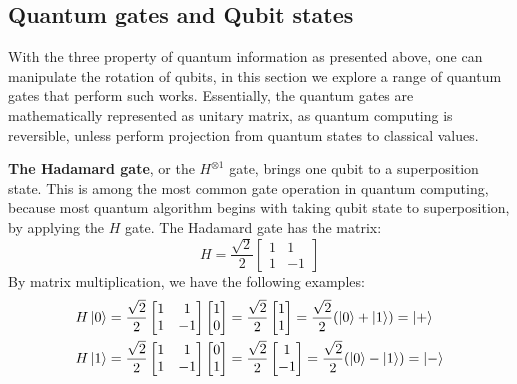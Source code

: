 \subsection{Quantum gates and Qubit states} \label{Sec: Quantum Gates}

With the three property of quantum information as presented above, one can manipulate the rotation of qubits, in this section we explore a range of quantum gates that perform such works.
Essentially, the quantum gates are mathematically represented as unitary matrix, as quantum computing is reversible, unless perform projection from quantum states to classical values.

\textbf{The Hadamard gate}, or the $H^{\otimes 1}$ gate, brings one qubit to a superposition state.
This is among the most common gate operation in quantum computing, because most quantum algorithm begins with taking qubit state to superposition, by applying the $H$ gate.
The Hadamard gate has the matrix:
\begin{equation}
    H = \frac{\sqrt{2}}{2}\begin{bmatrix}
        1 & 1  \\
        1 & -1
    \end{bmatrix}
\end{equation}
By matrix multiplication, we have the following examples:
\begin{equation}
    \begin{split}
        & H\left\vert{0}\right\rangle = \frac{\sqrt{2}}{2}\begin{bmatrix}
            1 & 1  \\
            1 & -1
        \end{bmatrix}
        \begin{bmatrix}
            1 \\ 0
        \end{bmatrix}
        = \frac{\sqrt{2}}{2}\begin{bmatrix}
            1 \\ 1
        \end{bmatrix}
        = \frac{\sqrt{2}}{2}(\left\vert{0}\right\rangle + \left\vert{1}\right\rangle)
        = \left\vert{+}\right\rangle \\
        & H\left\vert{1}\right\rangle = \frac{\sqrt{2}}{2}\begin{bmatrix}
            1 & 1  \\
            1 & -1
        \end{bmatrix}
        \begin{bmatrix}
            0 \\ 1
        \end{bmatrix}
        = \frac{\sqrt{2}}{2}\begin{bmatrix}
            1 \\ -1
        \end{bmatrix}
        = \frac{\sqrt{2}}{2}(\left\vert{0}\right\rangle - \left\vert{1}\right\rangle)
        = \left\vert{-}\right\rangle
    \end{split}
\end{equation}

